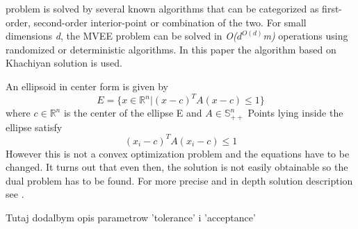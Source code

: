 \documentclass{llncs}
\begin{document}
problem is solved by several known algorithms that can be categorized as first-order, second-order interior-point or combination of the two. For small dimensions \textit{d}, the MVEE problem can be solved in \textit{O($d^{O(d)}$m)} operations using randomized or deterministic algorithms\cite{MVEEMichaelTodd2005}. In this paper the algorithm based on Khachiyan solution is used.

\noindent An ellipsoid in center form is given by \[ E = \{x \in \mathbb{R}^{n} | (x - c)^{T}A(x-c) \le 1\} \] where $c \in \mathbb{R}^{n}$ is the center of the ellipse E and $ A \in \mathbb{S}^{n}_{++}$ Points lying inside the ellipse satisfy \[ (x_{i} - c)^{T}A(x_{i} - c) \le 1 \] However this is not a convex optimization problem and the equations have to be changed. It turns out that even then, the solution is not easily obtainable so the dual problem has to be found. For more precise and in depth solution description see \cite{MVEEMichaelTodd2005}.

{\color{red}Tutaj dodalbym opis parametrow 'tolerance' i 'acceptance'}

\end{document}
